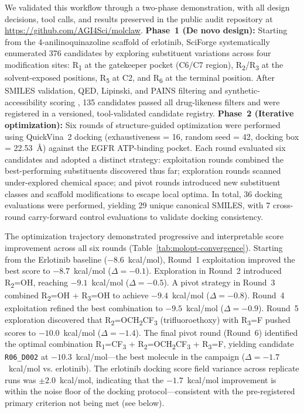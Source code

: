 \documentclass[sn-basic,Numbered,pdflatex]{sn-jnl}
\begin{document}
We validated this workflow through a two-phase demonstration, with all design decisions, tool calls, and results preserved in the public audit repository at \url{https://github.com/AGI4Sci/molclaw}. \textbf{Phase~1 (De novo design):} Starting from the 4-anilinoquinazoline scaffold of erlotinib, SciForge systematically enumerated 376 candidates by exploring substituent variations across four modification sites: R\textsubscript{1} at the gatekeeper pocket (C6/C7 region), R\textsubscript{2}/R\textsubscript{3} at the solvent-exposed positions, R\textsubscript{5} at C2, and R\textsubscript{6} at the terminal position. After SMILES validation, QED, Lipinski, and PAINS filtering and synthetic-accessibility scoring \cite{bickerton2012qed,lipinski2001ruleoffive,baell2010pains,ertl2009sa}, 135 candidates passed all drug-likeness filters and were registered in a versioned, tool-validated candidate registry. \textbf{Phase~2 (Iterative optimization):} Six rounds of structure-guided optimization were performed using QuickVina~2 docking \cite{alhossary2015quickvina2} (exhaustiveness = 16, random seed = 42, docking box = 22.53~\AA) against the EGFR ATP-binding pocket. Each round evaluated six candidates and adopted a distinct strategy: exploitation rounds combined the best-performing substituents discovered thus far; exploration rounds scanned under-explored chemical space; and pivot rounds introduced new substituent classes and scaffold modifications to escape local optima. In total, 36 docking evaluations were performed, yielding 29 unique canonical SMILES, with 7 cross-round carry-forward control evaluations to validate docking consistency.

The optimization trajectory demonstrated progressive and interpretable score improvement across all six rounds (Table~\ref{tab:molopt-convergence}). Starting from the Erlotinib baseline ($-8.6$~kcal/mol), Round~1 exploitation improved the best score to $-8.7$~kcal/mol ($\Delta=-0.1$). Exploration in Round~2 introduced R\textsubscript{2}=OH, reaching $-9.1$~kcal/mol ($\Delta=-0.5$). A pivot strategy in Round~3 combined R\textsubscript{2}=OH + R\textsubscript{3}=OH to achieve $-9.4$~kcal/mol ($\Delta=-0.8$). Round~4 exploitation refined the best combination to $-9.5$~kcal/mol ($\Delta=-0.9$). Round~5 exploration discovered that R\textsubscript{2}=OCH\textsubscript{2}CF\textsubscript{3} (trifluoroethoxy) with R\textsubscript{3}=F pushed scores to $-10.0$~kcal/mol ($\Delta=-1.4$). The final pivot round (Round~6) identified the optimal combination R\textsubscript{1}=CF\textsubscript{3} + R\textsubscript{2}=OCH\textsubscript{2}CF\textsubscript{3} + R\textsubscript{3}=F, yielding candidate \texttt{R06\_D002} at $-10.3$~kcal/mol---the best molecule in the campaign ($\Delta=-1.7$~kcal/mol vs. erlotinib). The erlotinib docking score field variance across replicate runs was $\pm 2.0$~kcal/mol, indicating that the $-1.7$~kcal/mol improvement is within the noise floor of the docking protocol---consistent with the pre-registered primary criterion not being met (see below).
\end{document}
